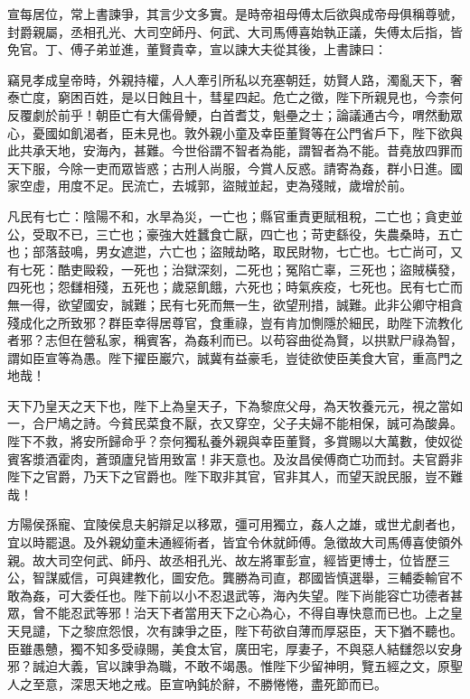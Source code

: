 \begin{pinyinscope}
宣每居位，常上書諫爭，其言少文多實。是時帝祖母傅太后欲與成帝母俱稱尊號，封爵親屬，丞相孔光、大司空師丹、何武、大司馬傅喜始執正議，失傅太后指，皆免官。丁、傅子弟並進，董賢貴幸，宣以諫大夫從其後，上書諫曰：

竊見孝成皇帝時，外親持權，人人牽引所私以充塞朝廷，妨賢人路，濁亂天下，奢泰亡度，窮困百姓，是以日蝕且十，彗星四起。危亡之徵，陛下所親見也，今柰何反覆劇於前乎！朝臣亡有大儒骨鯁，白首耆艾，魁壘之士；論議通古今，喟然動眾心，憂國如飢渴者，臣未見也。敦外親小童及幸臣董賢等在公門省戶下，陛下欲與此共承天地，安海內，甚難。今世俗謂不智者為能，謂智者為不能。昔堯放四罪而天下服，今除一吏而眾皆惑；古刑人尚服，今賞人反惑。請寄為姦，群小日進。國家空虛，用度不足。民流亡，去城郭，盜賊並起，吏為殘賊，歲增於前。

凡民有七亡：陰陽不和，水旱為災，一亡也；縣官重責更賦租稅，二亡也；貪吏並公，受取不已，三亡也；豪強大姓蠶食亡厭，四亡也；苛吏繇役，失農桑時，五亡也；部落鼓鳴，男女遮迣，六亡也；盜賊劫略，取民財物，七亡也。七亡尚可，又有七死：酷吏毆殺，一死也；治獄深刻，二死也；冤陷亡辜，三死也；盜賊橫發，四死也；怨讎相殘，五死也；歲惡飢餓，六死也；時氣疾疫，七死也。民有七亡而無一得，欲望國安，誠難；民有七死而無一生，欲望刑措，誠難。此非公卿守相貪殘成化之所致邪？群臣幸得居尊官，食重祿，豈有肯加惻隱於細民，助陛下流教化者邪？志但在營私家，稱賓客，為姦利而已。以苟容曲從為賢，以拱默尸祿為智，謂如臣宣等為愚。陛下擢臣巖穴，誠冀有益豪毛，豈徒欲使臣美食大官，重高門之地哉！

天下乃皇天之天下也，陛下上為皇天子，下為黎庶父母，為天牧養元元，視之當如一，合尸鳩之詩。今貧民菜食不厭，衣又穿空，父子夫婦不能相保，誠可為酸鼻。陛下不救，將安所歸命乎？奈何獨私養外親與幸臣董賢，多賞賜以大萬數，使奴從賓客漿酒霍肉，蒼頭廬兒皆用致富！非天意也。及汝昌侯傅商亡功而封。夫官爵非陛下之官爵，乃天下之官爵也。陛下取非其官，官非其人，而望天說民服，豈不難哉！

方陽侯孫寵、宜陵侯息夫躬辯足以移眾，彊可用獨立，姦人之雄，或世尤劇者也，宜以時罷退。及外親幼童未通經術者，皆宜令休就師傅。急徵故大司馬傅喜使領外親。故大司空何武、師丹、故丞相孔光、故左將軍彭宣，經皆更博士，位皆歷三公，智謀威信，可與建教化，圖安危。龔勝為司直，郡國皆慎選舉，三輔委輸官不敢為姦，可大委任也。陛下前以小不忍退武等，海內失望。陛下尚能容亡功德者甚眾，曾不能忍武等邪！治天下者當用天下之心為心，不得自專快意而已也。上之皇天見譴，下之黎庶怨恨，次有諫爭之臣，陛下苟欲自薄而厚惡臣，天下猶不聽也。臣雖愚戇，獨不知多受祿賜，美食太官，廣田宅，厚妻子，不與惡人結讎怨以安身邪？誠迫大義，官以諫爭為職，不敢不竭愚。惟陛下少留神明，覽五經之文，原聖人之至意，深思天地之戒。臣宣吶鈍於辭，不勝惓惓，盡死節而已。


\end{pinyinscope}
